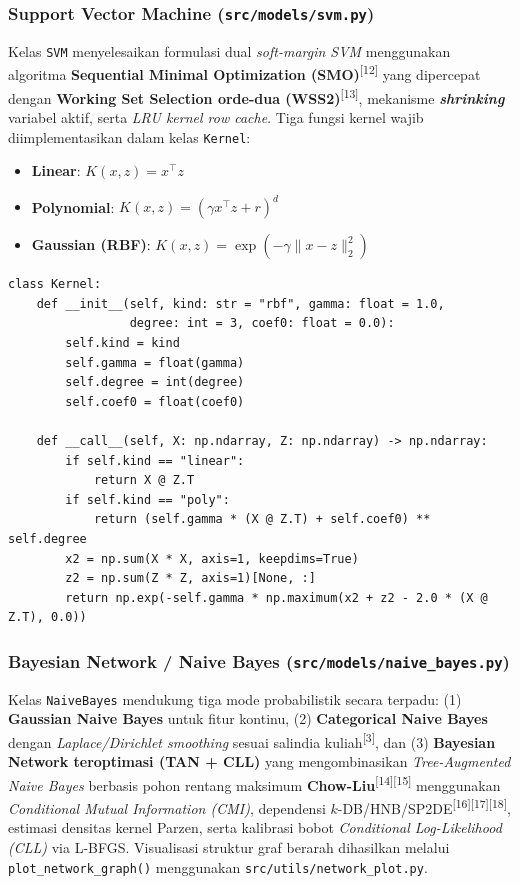 \documentclass[11pt,a4paper]{article}
\numberwithin{figure}{section}
\numberwithin{table}{section}
\newcommand{\fnmark}[1]{\textsuperscript{[#1]}}
\begin{document}
\subsubsection[Support Vector Machine]{Support Vector Machine (\texttt{src/models/svm.py})}

Kelas \texttt{SVM} menyelesaikan formulasi dual \textit{soft-margin SVM} menggunakan algoritma \textbf{Sequential Minimal Optimization (SMO)}\fnmark{12} yang dipercepat dengan \textbf{Working Set Selection orde-dua (WSS2)}\fnmark{13}, mekanisme \textbf{\textit{shrinking}} variabel aktif, serta \textit{LRU kernel row cache}. Tiga fungsi kernel wajib diimplementasikan dalam kelas \texttt{Kernel}:
\begin{itemize}[leftmargin=1.2cm, itemsep=1pt]
  \item \textbf{Linear}: $K(x, z) = x^\top z$
  \item \textbf{Polynomial}: $K(x, z) = (\gamma x^\top z + r)^d$
  \item \textbf{Gaussian (RBF)}: $K(x, z) = \exp(-\gamma \|x - z\|_2^2)$
\end{itemize}

\noindent\begin{minipage}{\linewidth}
\begin{lstlisting}
class Kernel:
    def __init__(self, kind: str = "rbf", gamma: float = 1.0,
                 degree: int = 3, coef0: float = 0.0):
        self.kind = kind
        self.gamma = float(gamma)
        self.degree = int(degree)
        self.coef0 = float(coef0)

    def __call__(self, X: np.ndarray, Z: np.ndarray) -> np.ndarray:
        if self.kind == "linear":
            return X @ Z.T
        if self.kind == "poly":
            return (self.gamma * (X @ Z.T) + self.coef0) ** self.degree
        x2 = np.sum(X * X, axis=1, keepdims=True)
        z2 = np.sum(Z * Z, axis=1)[None, :]
        return np.exp(-self.gamma * np.maximum(x2 + z2 - 2.0 * (X @ Z.T), 0.0))
\end{lstlisting}
\end{minipage}

\subsubsection[Bayesian Network / Naive Bayes]{Bayesian Network / Naive Bayes (\texttt{src/models/naive\_bayes.py})}

Kelas \texttt{NaiveBayes} mendukung tiga mode probabilistik secara terpadu: (1) \textbf{Gaussian Naive Bayes} untuk fitur kontinu, (2) \textbf{Categorical Naive Bayes} dengan \textit{Laplace/Dirichlet smoothing} sesuai salindia kuliah\fnmark{3}, dan (3) \textbf{Bayesian Network teroptimasi (TAN + CLL)} yang mengombinasikan \textit{Tree-Augmented Naive Bayes} berbasis pohon rentang maksimum \textbf{Chow-Liu}\fnmark{14}\fnmark{15} menggunakan \textit{Conditional Mutual Information (CMI)}, dependensi $k$-DB/HNB/SP2DE\fnmark{16}\fnmark{17}\fnmark{18}, estimasi densitas kernel Parzen, serta kalibrasi bobot \textit{Conditional Log-Likelihood (CLL)} via L-BFGS. Visualisasi struktur graf berarah dihasilkan melalui \texttt{plot\_network\_graph()} menggunakan \texttt{src/utils/network\_plot.py}.
\end{document}
